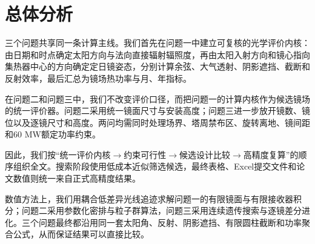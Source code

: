 \section{总体分析}
三个问题共享同一条计算主线。我们首先在问题一中建立可复核的光学评价内核：由日期和时点确定太阳方向与法向直接辐射辐照度，再由太阳入射方向和镜心指向集热器中心的方向确定定日镜姿态，分别计算余弦、大气透射、阴影遮挡、截断和反射效率，最后汇总为镜场热功率与月、年指标。

在问题二和问题三中，我们不改变评价口径，而把问题一的计算内核作为候选镜场的统一评价器。问题二采用统一镜面尺寸与安装高度；问题三进一步放开镜数、镜位以及逐镜尺寸和高度。两问均需同时处理场界、塔周禁布区、旋转离地、镜间距和$60$ MW额定功率约束。

因此，我们按“统一评价内核$\rightarrow$约束可行性$\rightarrow$候选设计比较$\rightarrow$高精度复算”的顺序组织全文。搜索阶段使用低成本近似筛选候选，最终表格、Excel提交文件和论文数值则统一来自正式高精度结果。

数值方法上，我们用耦合低差异光线追迹求解问题一的有限镜面与有限接收器积分；问题二采用参数化密排与粒子群算法，问题三采用连续遗传搜索与逐镜差分进化。三个问题最终都沿用同一套太阳角、反射、阴影遮挡、有限圆柱截断和功率聚合公式，从而保证结果可以直接比较。
